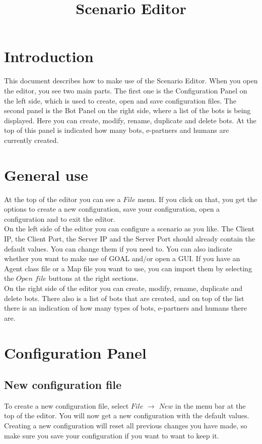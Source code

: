 \documentclass[a4paper]{article}
\title{Scenario Editor}
\date{}
\begin{document}
\maketitle
\newpage

\tableofcontents
\newpage

\section{Introduction}
This document describes how to make use of the Scenario Editor. When you open the editor, you see two main parts. The first one is the Configuration Panel on the left side, which is used to create, open and save configuration files. The second panel is the Bot Panel on the right side, where a list of the bots is being displayed. Here you can create, modify, rename, duplicate and delete bots. At the top of this panel is indicated how many bots, e-partners and humans are currently created.

\section{General use}
At the top of the editor you can see a $File$ menu. If you click on that, you get the options to create a new configuration, save your configuration, open a configuration and to exit the editor.\\
On the left side of the editor you can configure a scenario as you like. The Client IP, the Client Port, the Server IP and the Server Port should already contain the default values. You can change them if you need to. You can also indicate whether you want to make use of GOAL and/or open a GUI. If you have an Agent class file or a Map file you want to use, you can import them by selecting the $Open$ $file$ buttons at the right sections.\\
On the right side of the editor you can create, modify, rename, duplicate and delete bots. There also is a list of bots that are created, and on top of the list there is an indication of how many types of bots, e-partners and humans there are.

\section{Configuration Panel}
\subsection{New configuration file}
To create a new configuration file, select $File$ $\to$ $New$ in the menu bar at the top of the editor. You will now get a new configuration with the default values. Creating a new configuration will reset all previous changes you have made, so make sure you save your configuration if you want to want to keep it.
\end{document}
